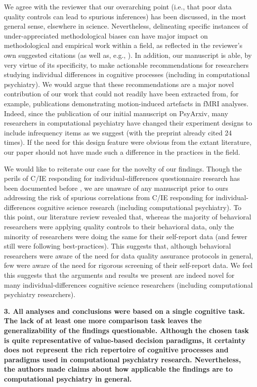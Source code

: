 \documentclass[a4paper,notitlepage,12pt]{article}
\begin{document}
We agree with the reviewer that our overarching point (i.e., that poor data quality controls can lead to spurious inferences) has been discussed, in the most general sense, elsewhere in science. Nevertheless, delineating specific instances of under-appreciated methodological biases can have major impact on methodological and empirical work within a field, as reflected in the reviewer's own suggested citations (as well as, e.g., \cite{eklund2016cluster, bradley2021unrepresentative}). In addition, our manuscript is able, by very virtue of its specificity, to make actionable recommendations for researchers studying individual differences in cognitive processes (including in computational psychiatry). We would argue that these recommendations are a major novel contribution of our work that could not readily have been extracted from, for example, publications demonstrating motion-induced artefacts in fMRI analyses. Indeed, since the publication of our initial manuscript on PsyArxiv, many researchers in computational psychiatry have changed their experiment designs to include infrequency items as we suggest (with the preprint already cited 24 times). If the need for this design feature were obvious from the extant literature, our paper should not have made such a difference in the practices in the field.

We would like to reiterate our case for the novelty of our findings. Though the perils of C/IE responding for individual-differences questionnaire research has been documented before \cite{chandler2020participant, arias2020little}, we are unaware of any manuscript prior to ours addressing the risk of spurious correlations from C/IE responding for individual-differences cognitive science research (including computational psychiatry). To this point, our literature review revealed that, whereas the majority of behavioral researchers were applying quality controls to their behavioral data, only the minority of researchers were doing the same for their self-report data (and fewer still were following best-practices). This suggests that, although behavioral researchers were aware of the need for data quality assurance protocols in general, few were aware of the need for rigorous screening of their self-report data. We feel this suggests that the arguments and results we present are indeed novel for many individual-differences cognitive science researchers (including computational psychiatry researchers).

\textbf{3. All analyses and conclusions were based on a single cognitive task. The lack of at least one more comparison task leaves the generalizability of the findings questionable. Although the chosen task is quite representative of value-based decision paradigms, it certainty does not represent the rich repertoire of cognitive processes and paradigms used in computational psychiatry research. Nevertheless, the authors made claims about how applicable the findings are to computational psychiatry in general.}
\end{document}
